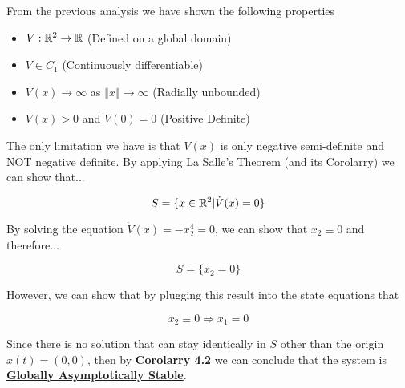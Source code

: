 From the previous analysis we have shown the following properties

\begin{itemize}
  \item $V: \mathbb{R}^2 \rightarrow \mathbb{R}$ (Defined on a global domain)
  \item $V \in C_1$ (Continuously differentiable)
  \item $V(x)\rightarrow \infty$ as $\left\Vert x \right\Vert \rightarrow \infty$ (Radially unbounded)
  \item $V(x) > 0$ and $V(0) = 0$ (Positive Definite)
\end{itemize}

\noindent The only limitation we have is that $\dot{V}(x)$ is only negative semi-definite and NOT negative definite. By applying La Salle's Theorem (and its Corolarry) we can show that...

$$
S = \{ x\in \mathbb{R}^2 | \dot{V}(x) = 0 \}
$$

\noindent By solving the equation $\dot{V}(x) = -x_2^4 = 0$, we can show that $x_2 \equiv 0 $ and therefore...

$$
S = \{ x_2 = 0 \}
$$

\noindent However, we can show that by plugging this result into the state equations that

$$
x_2 \equiv 0 \Rightarrow x_1 = 0
$$

\noindent Since there is no solution that can stay identically in $S$ other than the origin $x(t) = (0,0)$, then by \textbf{Corolarry 4.2} we can conclude that the system is \underline{\textbf{Globally Asymptotically Stable}}.

